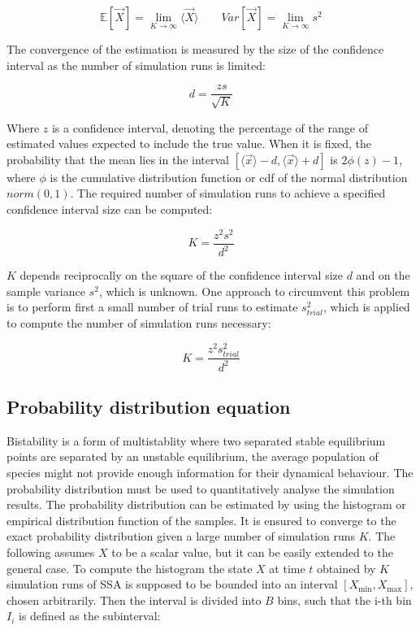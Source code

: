   $$\mathbb{E}[\vec{X}] = \lim\limits_{K\rightarrow\infty}\langle\vec{X}\rangle\qquad Var[\vec{X}] = \lim\limits_{K\rightarrow\infty}s^2$$

  The convergence of the estimation is measured by the size of the confidence interval as the number of simulation runs is limited:

  $$d = \frac{zs}{\sqrt{K}}$$

  Where $z$ is a confidence interval, denoting the percentage of the range of estimated values expected to include the true value.
  When it is fixed, the probability that the mean lies in the interval $[\langle\vec{x}\rangle-d, \langle\vec{x}\rangle+d]$ is $2\phi(z)-1$, where $\phi$ is the cumulative distribution function or cdf of the normal distribution $norm(0,1)$.
  The required number of simulation runs to achieve a specified confidence interval size can be computed:

  $$K = \frac{z^2s^2}{d^2}$$

  $K$ depends reciprocally on the square of the confidence interval size $d$ and on the sample variance $s^2$, which is unknown.
  One approach to circumvent this problem is to perform first a small number of trial runs to estimate $s_{trial}^2$, which is applied to compute the number of simulation runs necessary:

  $$K = \frac{z^2s_{trial}^2}{d^2}$$

  \subsection{Probability distribution equation}
  Bistability is a form of multistablity where two separated stable equilibrium points are separated by an unstable equilibrium, the average population of species might not provide enough information for their dynamical behaviour.
  The probability distribution must be used to quantitatively analyse the simulation results.
  The probability distribution can be estimated by using the histogram or empirical distribution function of the samples.
  It is ensured to converge to the exact probability distribution given a large number of simulation runs $K$.
  The following assumes $X$ to be a scalar value, but it can be easily extended to the general case.
  To compute the histogram the state $X$ at time $t$ obtained by $K$ simulation runs of SSA is supposed to be bounded into an interval $[X_{\min}, X_{\max}]$, chosen arbitrarily.
  Then the interval is divided into $B$ bins, such that the i-th bin $I_i$ is defined as the subinterval:

